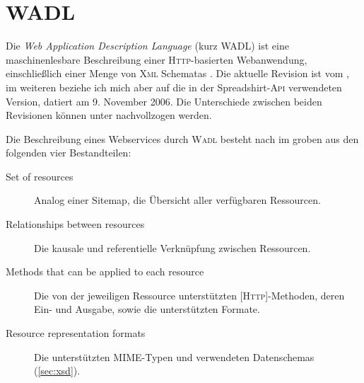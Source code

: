 \section{WADL}
\label{sec:wadl}

Die \emph{Web Application Description Language} (kurz \gls{WADL}) ist eine maschinenlesbare Beschreibung einer \textsc{Http}-basierten Webanwendung, einschließlich einer Menge von \textsc{Xml} Schematas \cite{hadleyWADL}.
Die aktuelle Revision ist vom  \cite{WADLcurrent}, im weiteren beziehe ich mich aber auf die in der Spreadshirt-\textsc{Api} verwendeten Version, datiert am 9. November 2006. Die Unterschiede zwischen beiden Revisionen können unter \cite{WADLchanges} nachvollzogen werden.

Die Beschreibung eines Webservices durch \textsc{Wadl} besteht nach \cite{hadleyWADL} im groben aus den folgenden vier Bestandteilen:
\begin{description}
     \item[Set of resources] Analog einer Sitemap, die Übersicht aller verfügbaren Ressourcen.
     \item[Relationships between resources] Die kausale und referentielle Verknüpfung zwischen Ressourcen.
     \item[Methods that can be applied to each resource] Die von der jeweiligen Ressource unterstützten [\textsc{Http}]-Methoden, deren Ein- und Ausgabe, sowie die unterstützten Formate.
     \item[Resource representation formats] Die unterstützten \gls{MIME}-Typen und verwendeten Datenschemas (\cref{sec:xsd}).
 \end{description} 

